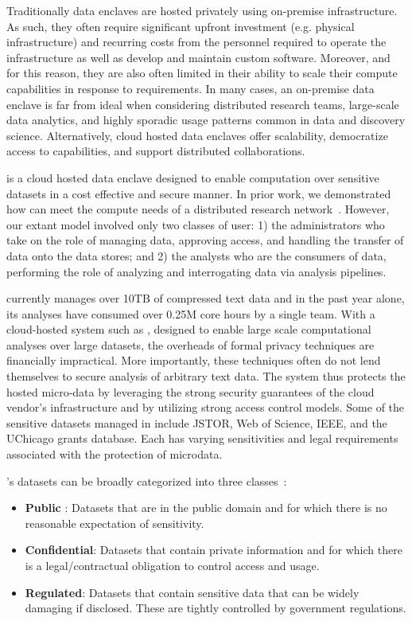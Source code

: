 Traditionally data enclaves are hosted privately using on-premise infrastructure. As
such, they often require significant upfront investment (e.g. physical infrastructure) and recurring costs 
from the personnel required to operate the infrastructure as well as develop and maintain custom software. 
Moreover, and for this reason, they are also often limited in their ability to scale their
compute capabilities in response to requirements. In many cases, an on-premise data enclave is far from ideal
when considering distributed research teams, large-scale data analytics, and highly sporadic
usage patterns common in data and discovery science. Alternatively, cloud hosted data enclaves offer scalability,
democratize access to capabilities, and support distributed collaborations. 

\NAME is a cloud hosted data enclave designed to enable computation over sensitive datasets
in a cost effective and secure manner. 
In prior work, we demonstrated how \NAME can meet the compute needs of a distributed research network~\cite{babuji2016cloud, babuji2016secure}.
However, our extant model involved only two classes of user: 1) the administrators who take on the role of
managing data, approving access, and handling the transfer of data onto the data stores; and 2) the analysts
who are the consumers of data, performing the role of analyzing and interrogating data
via analysis pipelines.

\NAME currently manages over 10TB of compressed text data and in the past year
alone, its analyses have consumed over 0.25M core hours by a single team. With a cloud-hosted system
such as \NAMENS, designed to enable large scale computational analyses over large datasets,
the overheads of formal privacy techniques are financially impractical. More importantly,
these techniques often do not lend themselves to secure analysis of arbitrary text data. 
The system thus protects the hosted micro-data by leveraging the strong security
guarantees of the cloud vendor's infrastructure and by utilizing strong access control
models. Some of the sensitive datasets managed in \NAME include JSTOR, Web of Science, IEEE,
and the UChicago grants database. Each has varying sensitivities and legal requirements associated with the
protection of microdata.

\NAMENS's datasets can be broadly categorized into three classes~\cite{ist_dataclass}:
\begin{itemize}
\item \textbf{Public} : Datasets that are in the public domain and for which there is no
  reasonable expectation of sensitivity.
\item \textbf{Confidential}: Datasets that contain private information and for which there is a legal/contractual obligation to control access and usage.
\item \textbf {Regulated}: Datasets that contain sensitive data that can be widely damaging if disclosed.
  These are tightly controlled by government regulations.
\end{itemize}

